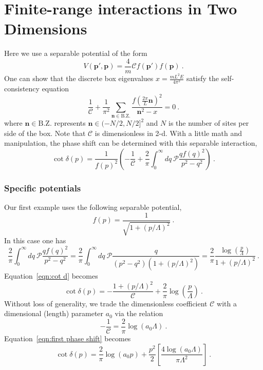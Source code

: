 \section{Finite-range interactions in Two Dimensions}\label{sec:two-d}

Here we use a separable potential of the form
\begin{equation}
V(\bm p',\bm p)=\frac{4}{m}\mathcal{C}f(\bm p')f(\bm p)\ .
\end{equation}
One can show that the discrete box eigenvalues $x=\frac{mL^2E}{4\pi^2}$ satisfy the self-consistency equation
\begin{equation}\label{eqn:SE}
\frac{1}{\mathcal{C}}+\frac{1}{\pi^2}\sum_{\bm n\in\mathrm{B.Z.}}\frac{f\left(\frac{2\pi}{L}\bm n\right)^2}{\bm n^2-x}=0\ .
\end{equation}
where $\bm n\in\mathrm{B.Z.}$ represents $\bm n\in(-N/2,N/2]^2$ and $N$ is the number of sites per side of the box.  Note that $\mathcal{C}$ is dimensionless in 2-d.  With a little math and manipulation, the phase shift can be determined with this separable interaction,
\begin{equation}\label{eqn:cot d}
\cot \delta(p) = \frac{1}{f(p)^2}\left(-\frac{1}{\mathcal{C}}+\frac{2}{\pi}\int_0^\infty dq \ \mathcal{P}\frac{qf(q)^2}{p^2-q^2}\right)\ .
\end{equation}

\subsubsection{Specific potentials}
Our first example uses the following separable potential,
\begin{equation}\label{eqn:potential1}
f(p)=\frac{1}{\sqrt{1+(p/\Lambda)^2}}\ .
\end{equation}
In this case one has
\begin{equation}
\frac{2}{\pi}\int_0^\infty dq \ \mathcal{P}\frac{qf(q)^2}{p^2-q^2}=\frac{2}{\pi}\int_0^\infty dq \ \mathcal{P}\frac{q}{(p^2-q^2)(1+(p/\Lambda)^2)}=\frac{2}{\pi}\frac{\log\left(\frac{p}{\Lambda}\right)}{1+(p/\Lambda)^2}\ .
\end{equation}
Equation~\eqref{eqn:cot d} becomes
\begin{equation}\label{eqn:first phase shift}
\cot\delta(p)=-\frac{1+(p/\Lambda)^2}{\mathcal{C}}+\frac{2}{\pi}\log\left(\frac{p}{\Lambda}\right)\ .
\end{equation}
Without loss of generality, we trade the dimensionless coefficient $\mathcal{C}$ with a dimensional (length) parameter $a_0$ via the relation
\begin{equation}
-\frac{1}{\mathcal{C}}=\frac{2}{\pi}\log(a_0\Lambda)\ .
\end{equation} 
Equation~\eqref{eqn:first phase shift} becomes
\begin{equation}
\cot\delta(p)=\frac{2}{\pi}\log(a_0p)+\frac{p^2}{2}\left[\frac{4\log(a_0\Lambda)}{\pi\Lambda^2}\right]\ .
\end{equation}


